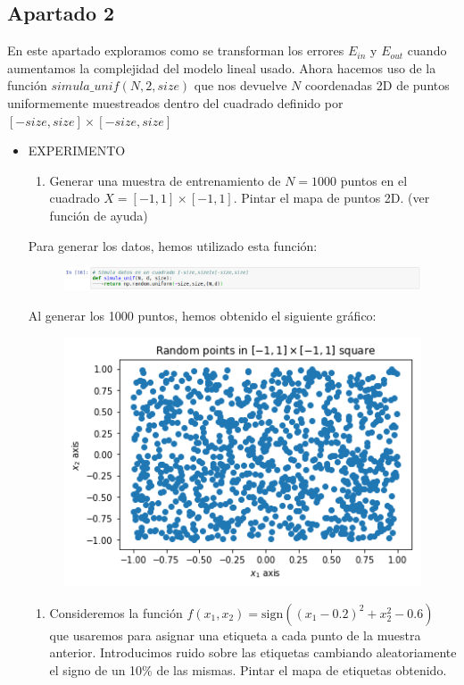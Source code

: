\documentclass[11pt,a4paper]{article}
\newcommand{\sign}{\text{sign}}
\begin{document}
\subsection*{Apartado 2}
\noindent En este apartado exploramos como se transforman los errores $E_{in}$ y $E_{out}$ cuando aumentamos la complejidad
del modelo lineal usado. Ahora hacemos uso de la función $simula\_unif (N, 2, size)$ que nos devuelve $N$ coordenadas 2D de
puntos uniformemente muestreados dentro del cuadrado definido por $[-size, size] \times [-size, size]$

\begin{itemize}
	\item EXPERIMENTO
	\begin{enumerate}[label=\alph*)]
		\item Generar una muestra de entrenamiento de $N = 1000$ puntos en el cuadrado $X = [-1, 1] \times [-1, 1]$.
		Pintar el mapa de puntos 2D. (ver función de ayuda)
	\end{enumerate}
	
	Para generar los datos, hemos utilizado esta función:
	
	\begin{figure}[H]
	\centering
	\includegraphics[scale=0.4]{img/simula_unif.png}
	\end{figure}
	
	Al generar los 1000 puntos, hemos obtenido el siguiente gráfico:
	
	\begin{figure}[H]
	\centering
	\includegraphics[scale=0.6]{img/random_points.png}
	\end{figure}
	
	\begin{enumerate}[resume, label=\alph*)]
		\item Consideremos la función $f(x_1, x_2) = \sign((x_1 - 0.2)^2 + x_2^2 - 0.6)$ que usaremos para asignar una
		etiqueta a cada punto de la muestra anterior. Introducimos ruido sobre las etiquetas cambiando aleatoriamente
		el signo de un 10\% de las mismas. Pintar el mapa de etiquetas obtenido.
	\end{enumerate}
	

\end{itemize}
\end{document}
